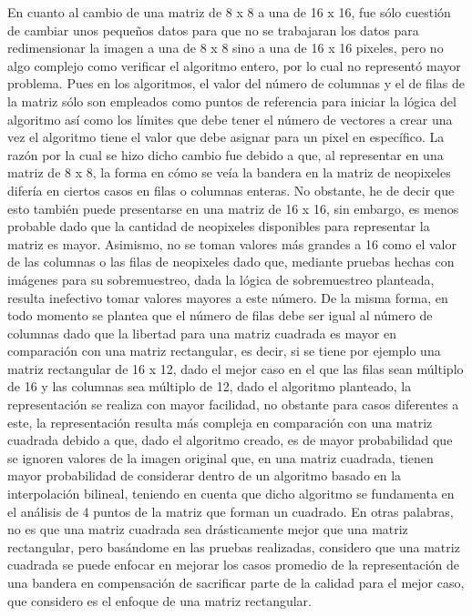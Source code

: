 \documentclass{article}
\begin{document}
En cuanto al cambio de una matriz de 8 x 8 a una de 16 x 16, fue sólo cuestión de cambiar unos pequeños datos para que no se trabajaran los datos para redimensionar la imagen a una de 8 x 8 sino a una de 16 x 16 pixeles, pero no algo complejo como verificar el algoritmo entero, por lo cual no representó mayor problema. Pues en los algoritmos, el valor del número de columnas y el de filas de la matriz sólo son empleados como puntos de referencia para iniciar la lógica del algoritmo así como los límites que debe tener el número de vectores a crear una vez el algoritmo tiene el valor que debe asignar para un pixel en específico. La razón por la cual se hizo dicho cambio fue debido a que, al representar en una matriz de 8 x 8, la forma en cómo se veía la bandera en la matriz de neopixeles difería en ciertos casos en filas o columnas enteras. No obstante, he de decir que esto también puede presentarse en una matriz de 16 x 16, sin embargo, es menos probable dado que la cantidad de neopixeles disponibles para representar la matriz es mayor. Asimismo, no se toman valores más grandes a 16 como el valor de las columnas o las filas de neopixeles dado que, mediante pruebas hechas con imágenes para su sobremuestreo, dada la lógica de sobremuestreo planteada, resulta inefectivo tomar valores mayores a este número. De la misma forma, en todo momento se plantea que el número de filas debe ser igual al número de columnas dado que la libertad para una matriz cuadrada es mayor en comparación con una matriz rectangular, es decir, si se tiene por ejemplo una matriz rectangular de 16 x 12, dado el mejor caso en el que las filas sean múltiplo de 16 y las columnas sea múltiplo de 12, dado el algoritmo planteado, la representación se realiza con mayor facilidad, no obstante para casos diferentes a este, la representación resulta más compleja en comparación con una matriz cuadrada debido a que, dado el algoritmo creado, es de mayor probabilidad que se ignoren valores de la imagen original que, en una matriz cuadrada, tienen mayor probabilidad de considerar dentro de un algoritmo basado en la interpolación bilineal, teniendo en cuenta que dicho algoritmo se fundamenta en el análisis de 4 puntos de la matriz que forman un cuadrado. En otras palabras, no es que una matriz cuadrada sea drásticamente mejor que una matriz rectangular, pero basándome en las pruebas realizadas, considero que una matriz cuadrada se puede enfocar en mejorar los casos promedio de la representación de una bandera en compensación de sacrificar parte de la calidad para el mejor caso, que considero es el enfoque de una matriz rectangular.



\end{document}
